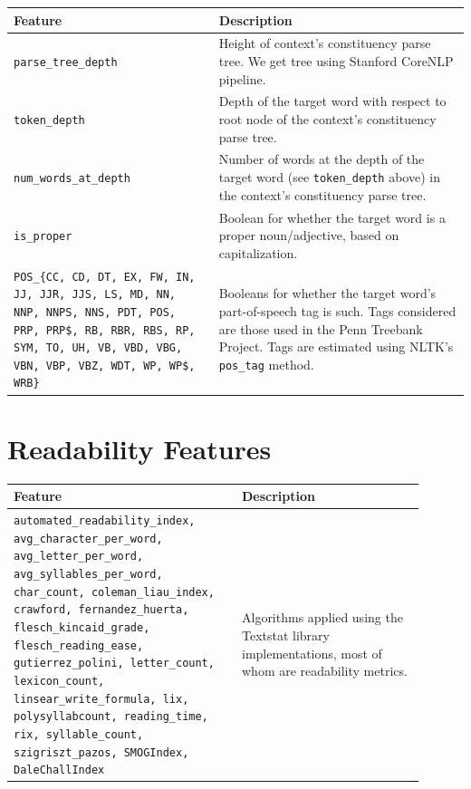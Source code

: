 \documentclass{dcthesis}
\theoremstyle{definition}
\theoremstyle{remark}
\begin{document}
\begin{table}[H]
  \centering
  \begin{tabular}{>{\centering\arraybackslash}p{0.45\linewidth}>{\arraybackslash}p{0.55\linewidth}}
    \textbf{Feature} & \textbf{Description} \\ \hline 
    \texttt{parse\_tree\_depth} & Height of context's constituency parse tree. We get tree using Stanford CoreNLP pipeline.\\
    \hline 
    \texttt{token\_depth} & Depth of the target word with respect to root node of the context's constituency parse tree.\\
    \hline 
    \texttt{num\_words\_at\_depth} & Number of words at the depth of the target word (see \texttt{token\_depth} above) in the context's constituency parse tree.\\
    \hline 
    \texttt{is\_proper} & Boolean for whether the target word is a proper noun/adjective, based on capitalization.\\
    \hline 
    \texttt{POS\_\{CC, CD, DT, EX, FW, IN, JJ, JJR, JJS, LS, MD, NN, NNP, NNPS, NNS, PDT, POS, PRP, PRP\$, RB, RBR, RBS, RP, SYM, TO, UH, VB, VBD, VBG, VBN, VBP, VBZ, WDT, WP, WP\$, WRB\}} & Booleans for whether the target word's part-of-speech tag is such. Tags considered are those used in the Penn Treebank Project.\tablefootnote{\url{https://www.ling.upenn.edu/courses/Fall_2003/ling001/penn_treebank_pos.html}} Tags are estimated using NLTK's \texttt{pos\_tag} method.\\
  \end{tabular}
  \label{syntactic_features}
\end{table}

\section{Readability Features}

\begin{table}[H]
  \centering
  \begin{tabular}{>{\centering\arraybackslash}p{0.5\linewidth}>{\arraybackslash}p{0.4\linewidth}}
    \textbf{Feature} & \textbf{Description} \\ \hline 
    \texttt{automated\_readability\_index, avg\_character\_per\_word, avg\_letter\_per\_word, avg\_syllables\_per\_word, char\_count, coleman\_liau\_index, crawford, fernandez\_huerta, flesch\_kincaid\_grade, flesch\_reading\_ease, gutierrez\_polini, letter\_count, lexicon\_count, linsear\_write\_formula, lix, polysyllabcount, reading\_time, rix, syllable\_count, szigriszt\_pazos, SMOGIndex, DaleChallIndex} & Algorithms applied using the Textstat library implementations, most of whom are readability metrics.\\
  \end{tabular}
  \label{readability_features}
\end{table}
\end{document}

